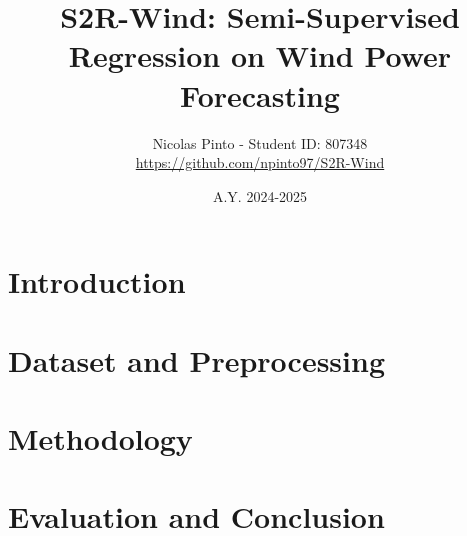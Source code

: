 \documentclass{article}
\title{S2R-Wind: Semi-Supervised Regression on Wind Power Forecasting}
\author{Nicolas Pinto - Student ID: 807348 \\\href{https://github.com/npinto97/S2R-Wind}{https://github.com/npinto97/S2R-Wind}}
\date{A.Y. 2024-2025}
\begin{document}
\maketitle

\section{Introduction}


\section{Dataset and Preprocessing}


\section{Methodology}


\section{Evaluation and Conclusion}






\end{document}
